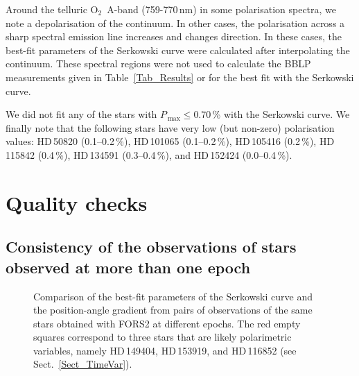 \documentclass[a4paper]{aa}
\newcommand{\pqe}{\ensuremath{P_Q^{\rm \,E}}}
\newcommand{\pue}{\ensuremath{P_U^{\rm \,E}}}
\newcommand{\pl}{\ensuremath{P}}
\newcommand{\thetae}{\ensuremath{\theta^{\rm \,E}}}
\newcommand{\pmax}{\ensuremath{P_\mathrm{\,max}}}
\begin{document}
Around the
telluric O$_2$~A-band (759-770\,nm) in some polarisation spectra, we note a depolarisation of the
continuum. In other cases, the polarisation across a sharp spectral emission line
increases and changes direction. In these cases, the best-fit
parameters of the Serkowski curve were calculated after
interpolating the continuum. These spectral regions were not used
to calculate the BBLP measurements given in
Table~\ref{Tab_Results} or for the best fit with the Serkowski curve.

We did not fit any of the stars with
$\pmax \le 0.70$\,\% with the Serkowski curve. We finally note that the following stars
have very low (but non-zero) polarisation values:
HD\,50820 (0.1--0.2\,\%),
HD\,101065 (0.1--0.2\,\%),
HD\,105416 (0.2\,\%),
HD\,115842 (0.4\,\%), 
HD\,134591 (0.3--0.4\,\%),
and HD\,152424 (0.0--0.4\,\%).



\section{Quality checks}
\subsection{Consistency of the observations of stars observed at more than
one epoch}\label{Sect_Cons_One}
\begin{figure}
\begin{center}
\end{center}
\caption{\label{Fig_SerComp} Comparison of the best-fit parameters of the Serkowski
  curve and the position-angle gradient from pairs of observations of the same stars
  obtained with FORS2 at different epochs. The red empty squares correspond to three
  stars that are likely polarimetric variables, namely
  HD\,149404, HD\,153919, and HD\,116852 (see Sect.~\ref{Sect_TimeVar}).}
\end{figure}
\end{document}
